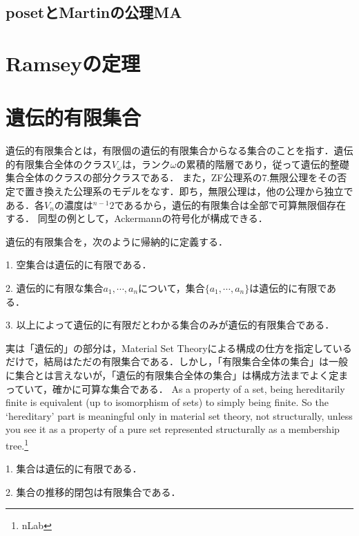 \documentclass[uplatex, dvipdfmx]{jsreport}
\begin{document}
\subsection{posetとMartinの公理MA}

\section{Ramseyの定理}

\section{遺伝的有限集合}

遺伝的有限集合とは，有限個の遺伝的有限集合からなる集合のことを指す．遺伝的有限集合全体のクラス$V_\omega$は，ランク$\omega$の累積的階層であり，従って遺伝的整礎集合全体のクラスの部分クラスである．
また，ZF公理系の7.無限公理をその否定で置き換えた公理系のモデルをなす．即ち，無限公理は，他の公理から独立である．各$V_n$の濃度は${}^{n-1}2$であるから，遺伝的有限集合は全部で可算無限個存在する．
同型の例として，Ackermannの符号化が構成できる．

\begin{definition}
    遺伝的有限集合を，次のように帰納的に定義する．

    1. 空集合は遺伝的に有限である．

    2. 遺伝的に有限な集合$a_1,\cdots,a_n$について，集合$\{a_1,\cdots,a_n\}$は遺伝的に有限である．

    3. 以上によって遺伝的に有限だとわかる集合のみが遺伝的有限集合である．
\end{definition}
\begin{remark}
    実は「遺伝的」の部分は，Material Set Theoryによる構成の仕方を指定しているだけで，結局はただの有限集合である．しかし，「有限集合全体の集合」は一般に集合とは言えないが，「遺伝的有限集合全体の集合」は構成方法までよく定まっていて，確かに可算な集合である．
    As a property of a set, being hereditarily finite is equivalent (up to isomorphism of sets) to simply being finite. So the ‘hereditary’ part is meaningful only in material set theory, not structurally, unless you see it as a property of a pure set represented structurally as a membership tree.\footnote{nLab}
\end{remark}

\begin{proposition}
    1. 集合は遺伝的に有限である．

    2. 集合の推移的閉包は有限集合である．
\end{proposition}
\end{document}
